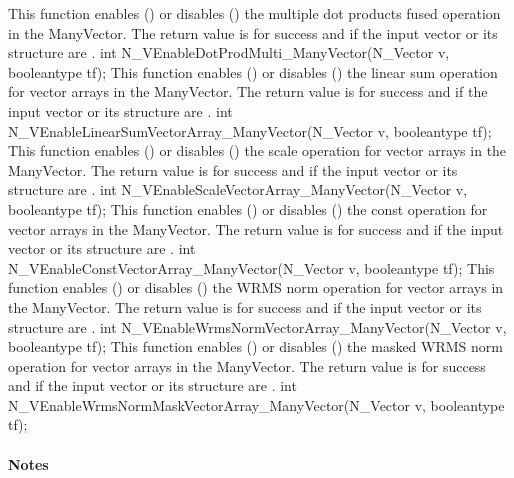 {
  This function enables () or disables () the multiple
  dot products fused operation in the ManyVector. The return value is 
  for success and  if the input vector or its  structure are
  .
}
{
  int N\_VEnableDotProdMulti\_ManyVector(N\_Vector v, booleantype tf);
}
{
  This function enables () or disables () the linear sum
  operation for vector arrays in the ManyVector. The return value is  for
  success and  if the input vector or its  structure are .
}
{
  int N\_VEnableLinearSumVectorArray\_ManyVector(N\_Vector v, booleantype tf);
}
{
  This function enables () or disables () the scale
  operation for vector arrays in the ManyVector. The return value is  for
  success and  if the input vector or its  structure are .
}
{
  int N\_VEnableScaleVectorArray\_ManyVector(N\_Vector v, booleantype tf);
}
{
  This function enables () or disables () the const
  operation for vector arrays in the ManyVector. The return value is  for
  success and  if the input vector or its  structure are .
}
{
  int N\_VEnableConstVectorArray\_ManyVector(N\_Vector v, booleantype tf);
}
{
  This function enables () or disables () the WRMS norm
  operation for vector arrays in the ManyVector. The return value is  for
  success and  if the input vector or its  structure are .
}
{
  int N\_VEnableWrmsNormVectorArray\_ManyVector(N\_Vector v, booleantype tf);
}
{
  This function enables () or disables () the masked WRMS
  norm operation for vector arrays in the ManyVector. The return value is
   for success and  if the input vector or its  structure are
  .
}
{
  int N\_VEnableWrmsNormMaskVectorArray\_ManyVector(N\_Vector v, booleantype tf);
}
\paragraph{\bf Notes} 
           
